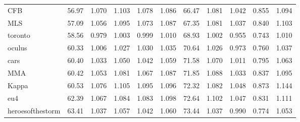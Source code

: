 \begin{tabular}{lrrrrrrrrrr}
CFB                 &         56.97 &               1.070 &               1.103 &               1.078 &               1.086 &                66.47 &                      1.081 &                      1.042 &                      0.855 &                      1.094 \\
MLS                 &         57.09 &               1.056 &               1.095 &               1.073 &               1.087 &                67.35 &                      1.081 &                      1.037 &                      0.840 &                      1.103 \\
toronto             &         58.56 &               0.979 &               1.003 &               0.999 &               1.010 &                68.93 &                      1.002 &                      0.955 &                      0.743 &                      1.010 \\
oculus              &         60.33 &               1.006 &               1.027 &               1.030 &               1.035 &                70.64 &                      1.026 &                      0.973 &                      0.760 &                      1.037 \\
cars                &         60.40 &               1.033 &               1.050 &               1.042 &               1.059 &                71.58 &                      1.070 &                      1.011 &                      0.795 &                      1.063 \\
MMA                 &         60.42 &               1.053 &               1.081 &               1.067 &               1.087 &                71.85 &                      1.088 &                      1.033 &                      0.837 &                      1.095 \\
Kappa               &         60.53 &               1.076 &               1.105 &               1.095 &               1.096 &                72.32 &                      1.082 &                      1.048 &                      0.873 &                      1.144 \\
eu4                 &         62.39 &               1.067 &               1.084 &               1.083 &               1.098 &                72.64 &                      1.102 &                      1.047 &                      0.831 &                      1.111 \\
heroesofthestorm    &         63.41 &               1.037 &               1.057 &               1.042 &               1.060 &                73.44 &                      1.037 &                      0.990 &                      0.774 &                      1.053 \\

\end{tabular}
